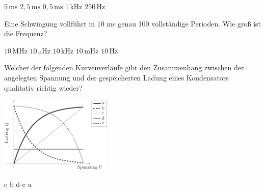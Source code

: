 \documentclass[11pt]{exam}
\begin{document}
\begin{questions}
\begin{choices}
	\choice \(\mathrm{5\,ms}\)
	\choice \(\mathrm{2,5\,ms}\)
	\choice \(\mathrm{0,5\,ms}\)
	\choice \(\mathrm{1\,kHz}\)
	\choice \(\mathrm{250\,Hz}\)
\end{choices}

\vspace{3mm}\question Eine Schwingung vollführt in 10 ms genau 100 vollständige Perioden. Wie groß ist die Frequenz?

\begin{choices}
	\choice \(\mathrm{10\,MHz}\)
	\choice \(\mathrm{10\,\mu Hz}\)
	\choice \(\mathrm{10\,kHz}\)
	\choice \(\mathrm{10\,mHz}\)
	\choice \(\mathrm{10\,Hz}\)
\end{choices}

\vspace{3mm}\question Welcher der folgenden Kurvenverläufe gibt den Zusammenhang zwischen der angelegten Spannung und der gespeicherten Ladung eines Kondensators qualitativ richtig wieder? 

\includegraphics[width=0.4\textwidth]{images/Kondensator-Q-U.png}

\begin{choices}
	\choice c
	\choice b
	\choice d
	\choice e
	\choice a
\end{choices}

\vspace{3mm}\end{questions}
\end{document}
